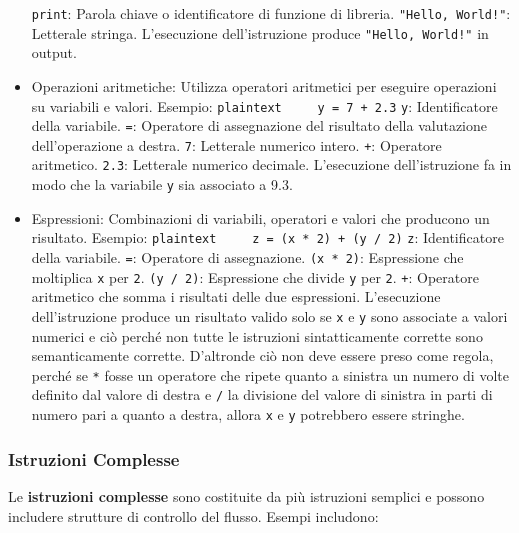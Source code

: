 \documentclass[
  letterpaper,
  DIV=11,
  numbers=noendperiod]{scrreprt}
\begin{document}
\begin{itemize}
  \texttt{print}: Parola chiave o identificatore di funzione di
  libreria. \texttt{"Hello,\ World!"}: Letterale stringa. L'esecuzione
  dell'istruzione produce \texttt{"Hello,\ World!"} in output.
\item
  Operazioni aritmetiche: Utilizza operatori aritmetici per eseguire
  operazioni su variabili e valori. Esempio:
  \texttt{plaintext\ \ \ \ \ y\ =\ 7\ +\ 2.3} \texttt{y}: Identificatore
  della variabile. \texttt{=}: Operatore di assegnazione del risultato
  della valutazione dell'operazione a destra. \texttt{7}: Letterale
  numerico intero. \texttt{+}: Operatore aritmetico. \texttt{2.3}:
  Letterale numerico decimale. L'esecuzione dell'istruzione fa in modo
  che la variabile \texttt{y} sia associato a 9.3.
\item
  Espressioni: Combinazioni di variabili, operatori e valori che
  producono un risultato. Esempio:
  \texttt{plaintext\ \ \ \ \ z\ =\ (x\ *\ 2)\ +\ (y\ /\ 2)} \texttt{z}:
  Identificatore della variabile. \texttt{=}: Operatore di assegnazione.
  \texttt{(x\ *\ 2)}: Espressione che moltiplica \texttt{x} per
  \texttt{2}. \texttt{(y\ /\ 2)}: Espressione che divide \texttt{y} per
  \texttt{2}. \texttt{+}: Operatore aritmetico che somma i risultati
  delle due espressioni. L'esecuzione dell'istruzione produce un
  risultato valido solo se \texttt{x} e \texttt{y} sono associate a
  valori numerici e ciò perché non tutte le istruzioni sintatticamente
  corrette sono semanticamente corrette. D'altronde ciò non deve essere
  preso come regola, perché se \texttt{*} fosse un operatore che ripete
  quanto a sinistra un numero di volte definito dal valore di destra e
  \texttt{/} la divisione del valore di sinistra in parti di numero pari
  a quanto a destra, allora \texttt{x} e \texttt{y} potrebbero essere
  stringhe.
\end{itemize}

\subsubsection{Istruzioni Complesse}\label{istruzioni-complesse}

Le \textbf{istruzioni complesse} sono costituite da più istruzioni
semplici e possono includere strutture di controllo del flusso. Esempi
includono:
\end{document}
